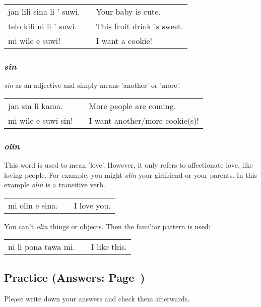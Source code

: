 \begin{supertabular}{p{5,5cm}|ll}
jan lili sina li ' suwi. && Your baby is cute. \\
telo kili ni li ' suwi. && This fruit drink is sweet. \\
mi wile e suwi! && I want a cookie! \\
\end{supertabular} 

%
\subsubsection*{\textit{sin}}
%
%
\textit{sin} as an adjective and simply means 'another' or 'more'. 

\begin{supertabular}{p{5,5cm}|ll}
jan sin li kama. && More people are coming. \\
mi wile e suwi sin! && I want another/more cookie(s)! \\
\end{supertabular} 

%
\subsubsection*{\textit{olin}}
%
%
This word is used to mean 'love'. 
However, it only refers to affectionate love, like loving people. 
For example, you might \textit{olin} your girlfriend or your parents.
In this example \textit{olin} is a transitive verb.

\begin{supertabular}{p{5,5cm}|ll}
mi olin e sina. && I love you. \\
\end{supertabular}  
 
You can't \textit{olin} things or objects. 
Then the familiar pattern is used:

\begin{supertabular}{p{5,5cm}|ll}
ni li pona tawa mi. && I like this.\\
\end{supertabular} 
%
%
\newpage{}
%
\subsection*{Practice (Answers: Page~\pageref{'questions_using_seme'})}
%
Please write down your answers and check them afterwards. 

